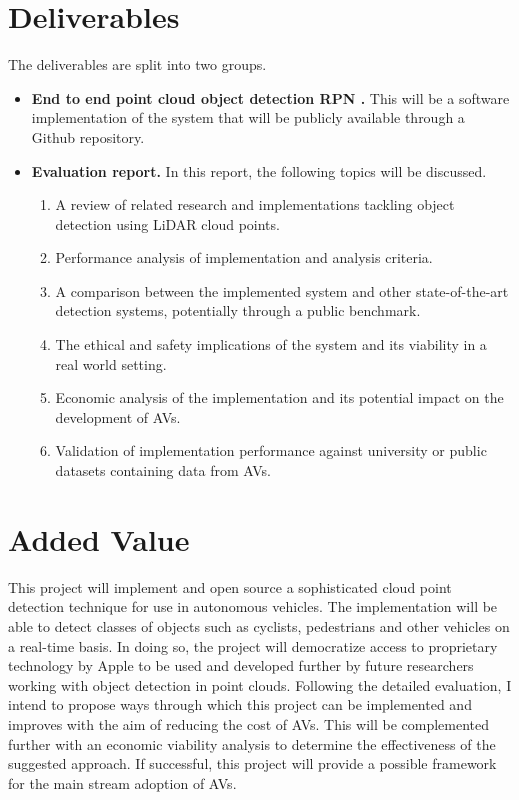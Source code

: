 \section{Deliverables}

The deliverables are split into two groups. 
\begin{itemize}
	 \item \textbf{End to end point cloud object detection RPN \cite{ren2015faster} .} This will be a software implementation of the system that will be publicly available through a Github repository. 
	\item \textbf{Evaluation report.} In this report, the following topics will be discussed. 
	\begin{enumerate}
		\item A review of related research and implementations tackling object detection using LiDAR cloud points. 
		\item Performance analysis of implementation and analysis criteria.
		\item A comparison between the implemented system and other state-of-the-art detection systems, potentially through a public benchmark. 
		\item The ethical and safety implications of the system and its viability in a real world setting. 
		\item Economic analysis of the implementation and its potential impact on the development of AVs. 
		\item Validation of implementation performance against university or public datasets containing data from AVs. 
	\end{enumerate}
\end{itemize}

\section{Added Value}

This project will implement and open source a sophisticated cloud point detection technique for use in autonomous vehicles. The implementation will be able to detect classes of objects such as cyclists, pedestrians and other vehicles on a real-time basis.
In doing so, the project will democratize access to proprietary technology by Apple \cite{zhou2017voxelnet} to be used and developed further by future researchers working with object detection in point clouds. 
Following the detailed evaluation, I intend to propose ways through which this project can be implemented and improves with the aim of reducing the cost of AVs. This will be complemented further with an economic viability analysis to determine the effectiveness of the suggested approach. 
If successful, this project will provide a possible framework for the main stream adoption of AVs. 

